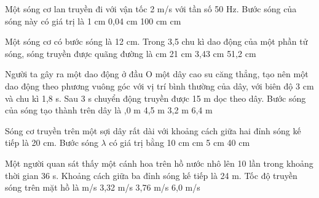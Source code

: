 \setcounter{paragraph}{0}
\PhanI
{}
\begin{ex}%
Một sóng cơ lan truyền đi với vận tốc 2 m/s với tần số 50 Hz. Bước sóng của sóng này có giá trị là
\choice
{1 cm}
{0,04 cm}
{100 cm}
{ cm}
\end{ex} 


\begin{ex}%
Một sóng cơ có bước sóng là 12 cm. Trong 3,5 chu kì dao động của một phần tử sóng, sóng truyền được quãng đường là
\choice
{ cm}
{21 cm}
{3,43 cm}
{51,2 cm}
\end{ex} 
\begin{ex}%
Người ta gây ra một dao động ở đầu O một dây cao su căng thẳng, tạo nên một dao động theo phương vuông góc với vị trí bình thường của dây, với biên độ 3 cm và chu kì 1,8 s. Sau 3 s chuyển động truyền được 15 m dọc theo dây. Bước sóng của sóng tạo thành trên dây là
\choice
{,0 m}
{4,5 m}
{3,2 m}
{6,4 m}
\end{ex} 
\begin{ex}%
Sóng cơ truyền trên một sợi dây rất dài với khoảng cách giữa hai đỉnh sóng kế tiếp là 20 cm. Bước sóng $\lambda $ có giá trị bằng
\choice
{10 cm}
{ cm}
{5 cm}
{40 cm}
\end{ex} 


\begin{ex}%
Một người quan sát thấy một cánh hoa trên hồ nước nhô lên 10 lần trong khoảng thời gian 36 s. Khoảng cách giữa ba đỉnh sóng kế tiếp là 24 m. Tốc độ truyền sóng trên mặt hồ là
\choice
{ m/s}
{3,32 m/s}
{3,76 m/s}
{6,0 m/s}

\end{ex} 

